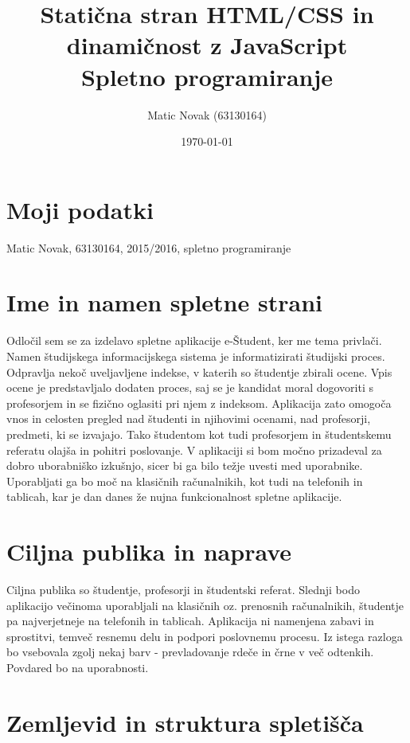 \documentclass[a4paper,11pt]{article}
\title{Statična stran HTML/CSS in dinamičnost z JavaScript \\ Spletno programiranje}
\author{Matic Novak (63130164)}
\date{\today}
\begin{document}
\maketitle

\section{Moji podatki}

Matic Novak, 63130164, 2015/2016, spletno programiranje

\section{Ime in namen spletne strani}

Odločil sem se za izdelavo spletne aplikacije e-Študent, ker me tema privlači. Namen študijskega informacijskega sistema je informatizirati študijski proces. Odpravlja nekoč uveljavljene indekse, v katerih so študentje zbirali ocene. Vpis ocene je predstavljalo dodaten proces, saj se je kandidat moral dogovoriti s profesorjem in se fizično oglasiti pri njem z indeksom. Aplikacija zato omogoča vnos in celosten pregled nad študenti in njihovimi ocenami, nad profesorji, predmeti, ki se izvajajo. Tako študentom kot tudi profesorjem in študentskemu referatu olajša in pohitri poslovanje. V aplikaciji si bom močno prizadeval za dobro uborabniško izkušnjo, sicer bi ga bilo težje uvesti med uporabnike. Uporabljati ga bo moč na klasičnih računalnikih, kot tudi na telefonih in tablicah, kar je dan danes že nujna funkcionalnost spletne aplikacije.

\section{Ciljna publika in naprave}

Ciljna publika so študentje, profesorji in študentski referat. Slednji bodo aplikacijo večinoma uporabljali na klasičnih oz. prenosnih računalnikih, študentje pa najverjetneje na telefonih in tablicah. Aplikacija ni namenjena zabavi in sprostitvi, temveč resnemu delu in podpori poslovnemu procesu. Iz istega razloga bo vsebovala zgolj nekaj barv - prevladovanje rdeče in črne v več odtenkih. Povdared bo na uporabnosti.

\section{Zemljevid in struktura spletišča}
\end{document}
